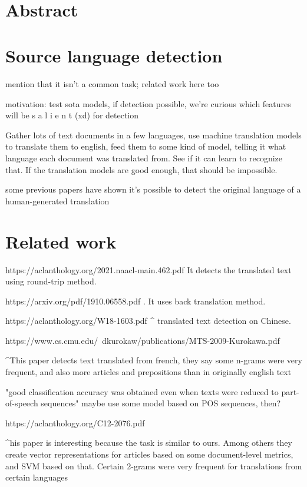 \documentclass[twocolumn]{article}
\title{{\Huge \textbf{}} \\ }
\author{ \\ {\small }}
\date{}
\begin{document}
\section*{Abstract}

\section*{Source language detection}

mention that it isn't a common task; related work here too

motivation: test sota models, if detection possible, we're curious which features will be  s a l i e n t  (xd) for detection

Gather lots of text documents in a few languages, use machine translation models to translate them to english, feed them to some kind of model, telling it what language each document was translated from. See if it can learn to recognize that. If the translation models are good enough, that should be impossible.

some previous papers have shown it’s possible to detect the original language of a human-generated translation

\section*{Related work}

https://aclanthology.org/2021.naacl-main.462.pdf 
 It detects the translated text using round-trip method. 


https://arxiv.org/pdf/1910.06558.pdf
. It uses back translation method. 


https://aclanthology.org/W18-1603.pdf
^ translated text detection on Chinese. 


https://www.cs.cmu.edu/~dkurokaw/publications/MTS-2009-Kurokawa.pdf

^This paper detects text translated from french, they say some n-grams were very frequent, and also more articles and prepositions than in originally english text

"good classification accuracy was obtained even when texts were reduced to part-of-speech sequences"  maybe use some model based on POS sequences, then?


https://aclanthology.org/C12-2076.pdf

^his paper is interesting because the task is similar to ours. Among others they create vector representations for articles based on some document-level metrics, and SVM based on that. Certain 2-grams were very frequent for translations from certain languages
\end{document}
